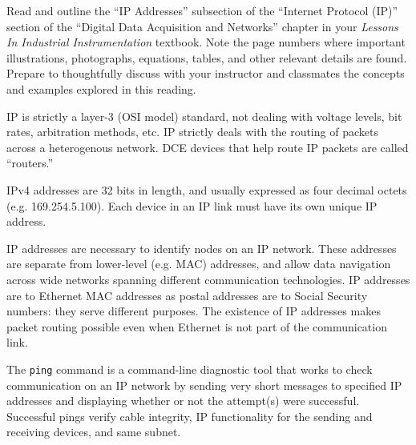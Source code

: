 

Read and outline the ``IP Addresses'' subsection of the ``Internet Protocol (IP)'' section of the ``Digital Data Acquisition and Networks'' chapter in your {\it Lessons In Industrial Instrumentation} textbook.  Note the page numbers where important illustrations, photographs, equations, tables, and other relevant details are found.  Prepare to thoughtfully discuss with your instructor and classmates the concepts and examples explored in this reading.














IP is strictly a layer-3 (OSI model) standard, not dealing with voltage levels, bit rates, arbitration methods, etc.  IP strictly deals with the routing of packets across a heterogenous network.  DCE devices that help route IP packets are called ``routers.''

\vskip 10pt

IPv4 addresses are 32 bits in length, and usually expressed as four decimal octets (e.g. 169.254.5.100).  Each device in an IP link must have its own unique IP address.

\vskip 10pt

IP addresses are necessary to identify nodes on an IP network.  These addresses are separate from lower-level (e.g. MAC) addresses, and allow data navigation across wide networks spanning different communication technologies.  IP addresses are to Ethernet MAC addresses as postal addresses are to Social Security numbers: they serve different purposes.  The existence of IP addresses makes packet routing possible even when Ethernet is not part of the communication link.

\vskip 10pt

The {\tt ping} command is a command-line diagnostic tool that works to check communication on an IP network by sending very short messages to specified IP addresses and displaying whether or not the attempt(s) were successful.  Successful pings verify cable integrity, IP functionality for the sending and receiving devices, and same subnet.

